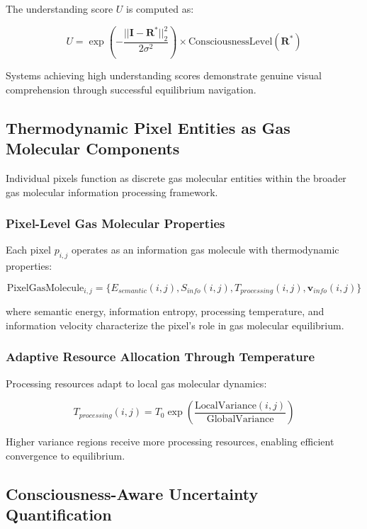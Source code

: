 \documentclass[12pt,a4paper]{article}
\begin{document}
The understanding score $U$ is computed as:

\begin{equation}
U = \exp\left(-\frac{||\mathbf{I} - \mathbf{R}^*||_2^2}{2\sigma^2}\right) \times \text{ConsciousnessLevel}(\mathbf{R}^*)
\end{equation}

Systems achieving high understanding scores demonstrate genuine visual comprehension through successful equilibrium navigation.

\subsection{Thermodynamic Pixel Entities as Gas Molecular Components}

Individual pixels function as discrete gas molecular entities within the broader gas molecular information processing framework.

\subsubsection{Pixel-Level Gas Molecular Properties}

Each pixel $p_{i,j}$ operates as an information gas molecule with thermodynamic properties:

\begin{equation}
\text{PixelGasMolecule}_{i,j} = \{E_{semantic}(i,j), S_{info}(i,j), T_{processing}(i,j), \mathbf{v}_{info}(i,j)\}
\end{equation}

where semantic energy, information entropy, processing temperature, and information velocity characterize the pixel's role in gas molecular equilibrium.

\subsubsection{Adaptive Resource Allocation Through Temperature}

Processing resources adapt to local gas molecular dynamics:

\begin{equation}
T_{processing}(i,j) = T_0 \exp\left(\frac{\text{LocalVariance}(i,j)}{\text{GlobalVariance}}\right)
\end{equation}

Higher variance regions receive more processing resources, enabling efficient convergence to equilibrium.

\subsection{Consciousness-Aware Uncertainty Quantification}
\end{document}
